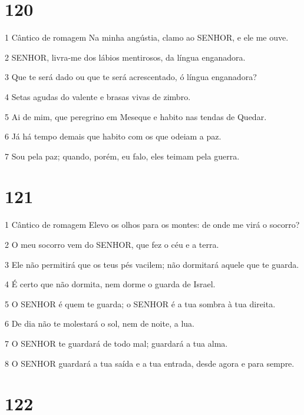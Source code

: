 \chapter{120}

\par 1 Cântico de romagem Na minha angústia, clamo ao SENHOR, e ele me ouve.
\par 2 SENHOR, livra-me dos lábios mentirosos, da língua enganadora.
\par 3 Que te será dado ou que te será acrescentado, ó língua enganadora?
\par 4 Setas agudas do valente e brasas vivas de zimbro.
\par 5 Ai de mim, que peregrino em Meseque e habito nas tendas de Quedar.
\par 6 Já há tempo demais que habito com os que odeiam a paz.
\par 7 Sou pela paz; quando, porém, eu falo, eles teimam pela guerra.

\chapter{121}

\par 1 Cântico de romagem Elevo os olhos para os montes: de onde me virá o socorro?
\par 2 O meu socorro vem do SENHOR, que fez o céu e a terra.
\par 3 Ele não permitirá que os teus pés vacilem; não dormitará aquele que te guarda.
\par 4 É certo que não dormita, nem dorme o guarda de Israel.
\par 5 O SENHOR é quem te guarda; o SENHOR é a tua sombra à tua direita.
\par 6 De dia não te molestará o sol, nem de noite, a lua.
\par 7 O SENHOR te guardará de todo mal; guardará a tua alma.
\par 8 O SENHOR guardará a tua saída e a tua entrada, desde agora e para sempre.

\chapter{122}

